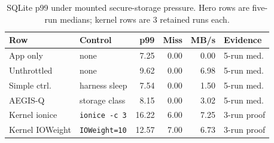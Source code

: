 \begin{table}[t]
\centering
\caption{SQLite p99 under mounted secure-storage pressure.  Hero rows are five-run medians; kernel rows are 3 retained runs each.}
\scriptsize
\setlength{\tabcolsep}{2pt}
\begin{tabularx}{\columnwidth}{P{0.18\columnwidth}|P{0.22\columnwidth}|r|r|r|P{0.18\columnwidth}}
\toprule
\textbf{Row} & \textbf{Control} & \textbf{p99} & \textbf{Miss} & \textbf{MB/s} & \textbf{Evidence}\\
\midrule
App only & none & 7.25 & 0.00 & 0.00 & 5-run med.\\
Unthrottled & none & 9.62 & 0.00 & 6.98 & 5-run med.\\
Simple ctrl. & harness sleep & 7.54 & 0.00 & 1.50 & 5-run med.\\
AEGIS-Q & storage class & 8.15 & 0.00 & 3.02 & 5-run med.\\
Kernel ionice & \texttt{ionice -c 3} & 16.22 & 6.00 & 7.25 & 3-run proof\\
Kernel IOWeight & \texttt{IOWeight=10} & 12.57 & 7.00 & 6.73 & 3-run proof\\
\bottomrule
\end{tabularx}
\label{tab:qos_sqlite_recovery}
\end{table}
